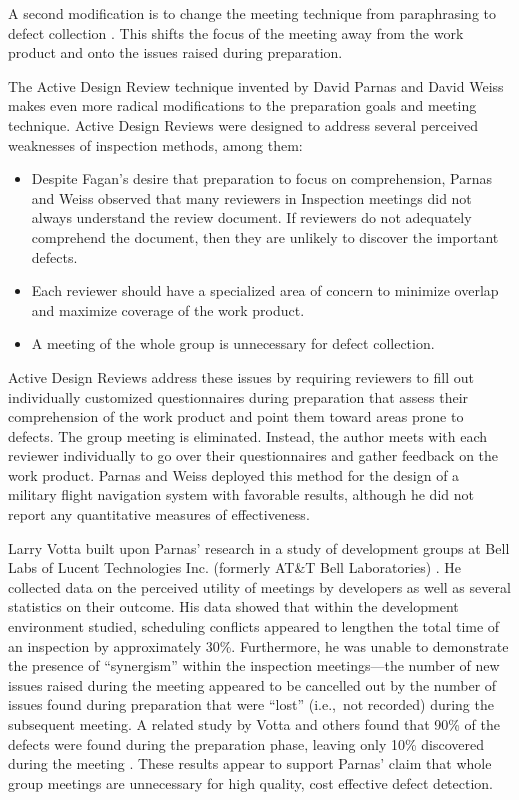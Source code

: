 A second modification is to change the meeting technique from paraphrasing
to defect collection \cite{Gilb93,Humphrey90}.  This shifts the focus of the
meeting away from the work product and onto the issues raised during
preparation. 

The Active Design Review technique \cite{Parnas87} invented by David Parnas
and David Weiss makes even more radical modifications to the preparation
goals and meeting technique. Active Design Reviews were designed to address
several perceived weaknesses of inspection methods, among them:

\begin{itemize}
\item Despite Fagan's desire that preparation to focus on comprehension,
Parnas and Weiss observed that many reviewers in Inspection meetings did
not always understand the review document. If reviewers do not adequately comprehend the document, then they are
      unlikely to discover the important defects. 
\item Each reviewer should have a specialized area of concern to minimize 
      overlap and maximize coverage of the work product.
\item A meeting of the whole group is unnecessary for defect collection. 
\end{itemize}

Active Design Reviews address these issues by requiring reviewers to fill
out individually customized questionnaires during preparation that assess
their comprehension of the work product and point them toward areas prone
to defects.  The group meeting is eliminated. Instead, the author meets
with each reviewer individually to go over their questionnaires and gather
feedback on the work product. Parnas and Weiss deployed this method for the design
of a military flight navigation system with favorable results, although he
did not report any quantitative measures of effectiveness.

Larry Votta built upon Parnas' research in a study of development groups at 
Bell Labs of Lucent Technologies Inc. (formerly AT\&T Bell Laboratories)
\cite{Votta93}.  He collected data on the perceived utility of
meetings by developers as well as several statistics on their outcome. His
data showed that within the development environment studied, scheduling
conflicts appeared to lengthen the total time of an inspection by
approximately 30\%.  Furthermore, he was unable to demonstrate the presence
of ``synergism'' within the inspection meetings---the number of new issues
raised during the meeting appeared to be cancelled out by the number of issues
found during preparation that were ``lost'' (i.e.,~not recorded) during the
subsequent meeting.  A related study by Votta and others found that 90\% of
the defects were found during the preparation phase, leaving only 10\%
discovered during the meeting \cite{Eick92}.  These results appear to
support Parnas' claim that whole group meetings are unnecessary for 
high quality, cost effective defect detection.

